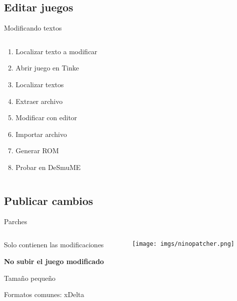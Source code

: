 \subsection{Editar juegos}
\begin{frame}{Modificando textos}
    \begin{columns}
    \begin{column}{0.5\textwidth}
        \begin{enumerate}
            \item<1-> Localizar texto a modificar
            \item<2-> Abrir juego en Tinke
            \item<3-> Localizar textos
            \item<4-> Extraer archivo
            \item<5-> Modificar con editor
            \item<6-> Importar archivo
            \item<7-> Generar ROM
            \item<8-> Probar en DeSmuME
        \end{enumerate}
    \end{column}
    \hfill
    \begin{column}{0.5\textwidth}
        \centering
    \end{column}
    \end{columns}
\end{frame}

\subsection{Publicar cambios}
\begin{frame}{Parches}
    \begin{columns}
    \begin{column}{0.6\textwidth}
        \small
        \begin{wideitemize}
            \item<1-> Solo contienen las modificaciones
            \item<2-> \textbf{No subir el juego modificado}
            \item<3-> Tamaño pequeño
            \item<4-> Formatos comunes: xDelta
        \end{wideitemize}
    \end{column}
    \begin{column}{0.4\textwidth}
        \texttt{[image: imgs/ninopatcher.png]}
    \end{column}
    \end{columns}
\end{frame}

